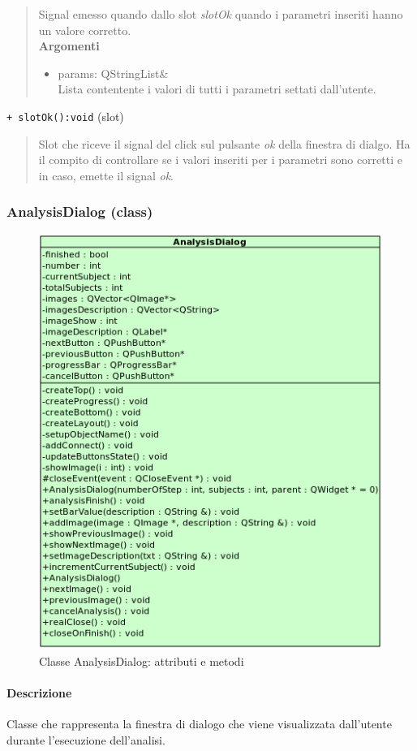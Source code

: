\begin{quote}
Signal\g{} emesso quando dallo slot\g{} \emph{slotOk} quando i parametri inseriti hanno un valore corretto.
\\ \textbf{Argomenti}
\begin{itemize}
\item params: QStringList\& \\ Lista contentente i valori di tutti i parametri settati dall'utente.
\end{itemize}
\end{quote}
\color{blue}\verb!+ slotOk():void! (slot)
\color{black}
\begin{quote}Slot\g{} che riceve il signal\g{} del click sul pulsante \emph{ok} della finestra di dialgo. Ha il compito di controllare se i valori inseriti per i parametri sono corretti e in caso, emette il signal\g{} \emph{ok}.\\ 
\end{quote} 
\color{black}
\pagebreak
\subsubsection{AnalysisDialog (class)}
\label{speAnaD}
\begin{figure}[!h]
\centering
			\includegraphics[width=0.6\linewidth] {./Content/Immagini/view/AnalysisDialog.png}
			\caption{Classe AnalysisDialog: attributi e metodi}
			\label{cl_anaDia}
\end{figure}
\paragraph{Descrizione \\}
Classe che rappresenta la finestra di dialogo che viene visualizzata dall'utente durante l'esecuzione dell'analisi.
